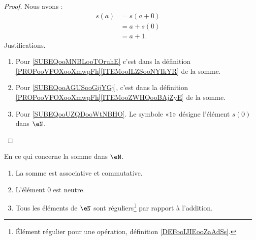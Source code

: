 \begin{proof}
	Nous avons :
	\begin{subequations}
		\begin{align}
			s(a) & =s(a+0)        \label{SUBEQooMNBLooTOruhE} \\
			     & =a+s(0)        \label{SUBEQooAGUSooGijYGj} \\
			     & =a+1.          \label{SUBEQooUZQDooWtNBHO}
		\end{align}
	\end{subequations}
	Justifications.
	\begin{enumerate}
		\item
		      Pour \eqref{SUBEQooMNBLooTOruhE} c'est dans la définition \ref{PROPooVFOXooXmwpFh}\ref{ITEMooILZSooNYIkYR} de la somme.
		\item
		      Pour \eqref{SUBEQooAGUSooGijYGj}, c'est dans la définition \ref{PROPooVFOXooXmwpFh}\ref{ITEMooZWHQooBAjZyE} de la somme.
		\item
		      Pour \eqref{SUBEQooUZQDooWtNBHO}. Le symbole «\( 1\)» désigne l'élément \( s(0)\) dans \( \eN\).
	\end{enumerate}
\end{proof}

\begin{proposition}     \label{PROPooTLTSooGNMTmV}
	En ce qui concerne la somme dans \( \eN\).
	\begin{enumerate}
		\item       \label{ITEMooIFFPooXfftfG}
		      La somme est associative et commutative.
		\item       \label{ITEMooSGRVooPAVFYK}
		      L'élément \( 0\) est neutre.
		\item       \label{ITEMooNUTHooJWWzGv}
		      Tous les éléments de \( \eN\) sont réguliers\footnote{Élément régulier pour une opération, définition \ref{DEFooIJIEooZaAdSs}.} par rapport à l'addition.
	\end{enumerate}
\end{proposition}

